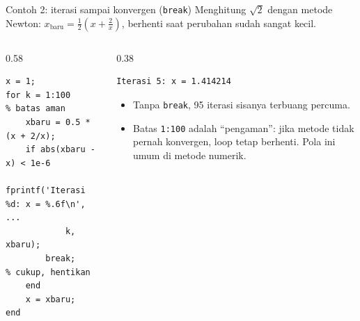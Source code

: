\documentclass[aspectratio=169,10pt]{beamer}
\newcommand{\codesize}{\footnotesize}
\newcommand{\kode}[1]{\texttt{#1}}
\begin{document}
\begin{frame}[fragile]{Contoh 2: iterasi sampai konvergen \hfill\small(\kode{break})}
  \renewcommand{\codesize}{\scriptsize}
  Menghitung $\sqrt{2}$ dengan metode Newton: $x_{\text{baru}} = \tfrac{1}{2}\left(x + \tfrac{2}{x}\right)$,
  berhenti saat perubahan sudah sangat kecil.
  \begin{columns}[T]
    \begin{column}{0.58\textwidth}
\begin{lstlisting}
x = 1;
for k = 1:100               % batas aman
    xbaru = 0.5 * (x + 2/x);
    if abs(xbaru - x) < 1e-6
        fprintf('Iterasi %d: x = %.6f\n', ...
            k, xbaru);
        break;              % cukup, hentikan
    end
    x = xbaru;
end
\end{lstlisting}
    \end{column}
    \begin{column}{0.38\textwidth}
\begin{lstlisting}[style=out]
Iterasi 5: x = 1.414214
\end{lstlisting}
      \vspace{4pt}
      \footnotesize
      \begin{itemize}
        \item Tanpa \kode{break}, 95 iterasi sisanya terbuang percuma.
        \item Batas \kode{1:100} adalah ``pengaman'': jika metode tidak pernah konvergen, loop tetap
              berhenti. Pola ini umum di metode numerik.
      \end{itemize}
    \end{column}
  \end{columns}
\end{frame}
\end{document}

